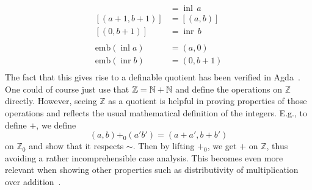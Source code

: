 \documentclass[preprint,12pt]{elsarticle}
\newcommand{\bocks}[1]{[#1]}
\newcommand{\emb}{\mathrm{emb}}
\newcommand{\Z}{\mathbb{Z}}
\newcommand{\inl}{\mathop{\mathrm{inl}}}
\newcommand{\inr}{\mathop{\mathrm{inr}}}
\begin{document}
\begin{align*}
\bocks{(a,0)} &= \inl\,a\\
\bocks{(a+1,b+1)} &= \bocks{(a,b)}\\
\bocks{(0,b+1)} &= \inr\,b\\\\
\emb (\inl a) &= (a,0)\\
\emb (\inr b) &= (0,b+1)\\
\end{align*}
The fact that this gives rise to a definable quotient has been verified in Agda~\cite{nuo:report:2010}.
 One could of course just use that $\Z=\nat + \nat$ and define the operations on $\Z$ directly. However, seeing  $\Z$ as a quotient is helpful in proving properties of those operations and reflects the usual mathematical definition of the integers. E.g., to define $+$, we define 
\[(a,b){+_0}(a'b')= (a+a',b+b')\]
on $\Z_0$ and show that it respects $\sim$. Then by lifting $+_0$, we get $+$ on $\Z$, thus avoiding a rather incomprehensible case analysis. This becomes even more relevant when showing other properties such as distributivity of multiplication over addition~\cite{nuo:report:2010}.
\end{document}
